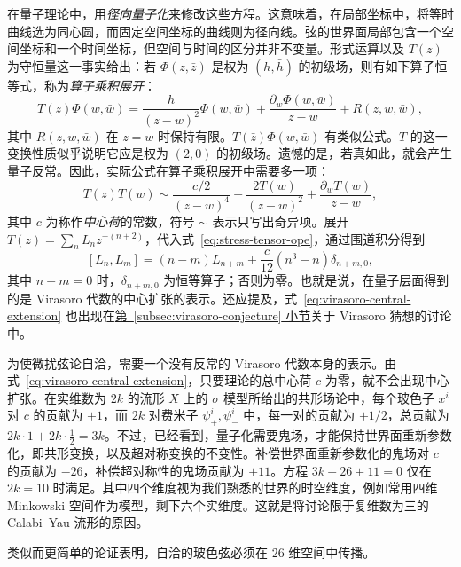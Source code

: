在量子理论中，用\emph{径向量子化}来修改这些方程。这意味着，在局部坐标中，将等时曲线选为同心圆，而固定空间坐标的曲线则为径向线。弦的世界面局部包含一个空间坐标和一个时间坐标，但空间与时间的区分并非不变量。形式运算以及 $T(z)$ 为守恒量这一事实给出：若 $\Phi(z,\bar z)$ 是权为 $(h,\bar h)$ 的初级场，则有如下算子恒等式，称为\emph{算子乘积展开}：
\[
T(z)\Phi(w,\bar w)
=\frac h{(z-w)^2}\Phi(w,\bar w)
+\frac{\partial_w\Phi(w,\bar w)}{z-w}+R(z,w,\bar w),
\]
其中 $R(z,w,\bar w)$ 在 $z=w$ 时保持有限。$\bar T(\bar z)\Phi(w,\bar w)$ 有类似公式。$T$ 的这一变换性质似乎说明它应是权为 $(2,0)$ 的初级场。遗憾的是，若真如此，就会产生
量子反常。因此，实际公式在算子乘积展开中需要多一项：
\begin{equation}\label{eq:stress-tensor-ope}
T(z)T(w)\sim\frac{c/2}{(z-w)^4}
+\frac{2T(w)}{(z-w)^2}+\frac{\partial_wT(w)}{z-w},
\end{equation}
其中 $c$ 为称作\emph{中心荷}的常数，符号 $\sim$ 表示只写出奇异项。展开 $T(z)=\sum_nL_nz^{-(n+2)}$，代入式~\eqref{eq:stress-tensor-ope}，通过围道积分得到
\begin{equation}\label{eq:virasoro-central-extension}
[L_n,L_m]=(n-m)L_{n+m}+\frac c{12}(n^3-n)\delta_{n+m,0},
\end{equation}
其中 $n+m=0$ 时，$\delta_{n+m,0}$ 为恒等算子；否则为零。也就是说，在量子层面得到的是 Virasoro 代数的中心扩张的表示。还应提及，式~\eqref{eq:virasoro-central-extension} 也出现在\hyperref[subsec:virasoro-conjecture]{第~\ref*{subsec:virasoro-conjecture} 小节}关于 Virasoro 猜想的讨论中。

为使微扰弦论自洽，需要一个没有反常的 Virasoro 代数本身的表示。由式~\eqref{eq:virasoro-central-extension}，只要理论的总中心荷 $c$ 为零，就不会出现中心扩张。在实维数为 $2k$ 的流形 $X$ 上的 $\sigma$ 模型所给出的共形场论中，每个玻色子 $x^i$ 对 $c$ 的贡献为 $+1$，而 $2k$ 对费米子 $\psi_+^i,\psi_-^i$ 中，每一对的贡献为 $+1/2$，总贡献为 $2k\cdot1+2k\cdot\tfrac12=3k$。不过，已经看到，量子化需要鬼场，才能保持世界面重新参数化，即共形变换，以及超对称变换的不变性。补偿世界面重新参数化的鬼场对 $c$ 的贡献为 $-26$，补偿超对称性的鬼场贡献为 $+11$。方程 $3k-26+11=0$ 仅在 $2k=10$ 时满足。其中四个维度视为我们熟悉的世界的时空维度，例如常用四维 Minkowski 空间作为模型，剩下六个实维度。这就是将讨论限于复维数为三的 Calabi--Yau 流形的原因。

类似而更简单的论证表明，自洽的玻色弦必须在 $26$ 维空间中传播。

